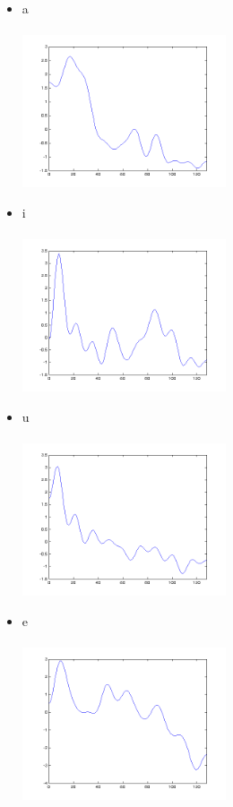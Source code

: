 \documentclass[10pt]{jsarticle}
\begin{document}
\begin{itemize}
\item a\\ \\
\includegraphics[width = 6cm]{result_textures/a_cepstrum.png}
\item i\\ \\
\includegraphics[width = 6cm]{result_textures/i_cepstrum.png}
\clearpage
\item u\\ \\
\includegraphics[width = 6cm]{result_textures/u_cepstrum.png}
\item e\\ \\
\includegraphics[width = 6cm]{result_textures/e_cepstrum.png}

\end{itemize}
\end{document}
